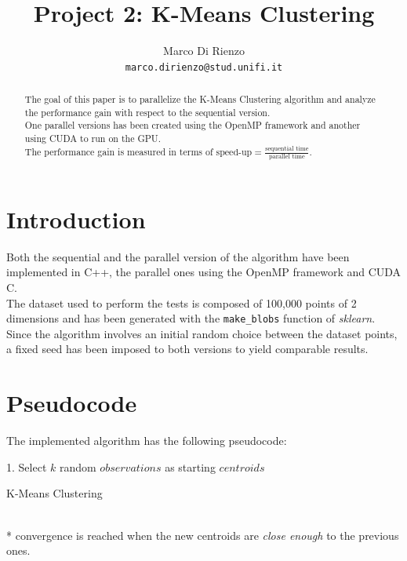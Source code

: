 \documentclass[10pt,twocolumn,letterpaper]{article}
\begin{document}
\title{Project 2: K-Means Clustering}

\author{Marco Di Rienzo\\
{\tt\small marco.dirienzo@stud.unifi.it}
}

\maketitle
\thispagestyle{empty}

\begin{abstract}
	The goal of this paper is to parallelize the K-Means Clustering algorithm and analyze the performance gain with respect to the sequential version.\\
	One parallel versions has been created using the OpenMP framework and another using CUDA to run on the GPU.\\
	The performance gain is measured in terms of $\text{speed-up}=\frac{\text{sequential time}}{\text{parallel time}}$.
\end{abstract}

\section{Introduction}
Both the sequential and the parallel version of the algorithm have been implemented in C++, the parallel ones using the OpenMP framework and CUDA C.\\
The dataset used to perform the tests is composed of 100,000 points of 2 dimensions and has been generated with the \texttt{make\_blobs} function of \textit{sklearn}.\\
Since the algorithm involves an initial random choice between the dataset points, a fixed seed has been imposed to both versions to yield comparable results.

\section{Pseudocode}
The implemented algorithm has the following pseudocode:
\begin{algorithm}
	\SetAlgoLined
	1. Select $k$ random $observations$ as starting $centroids$\;
	\caption{K-Means Clustering}
	\label{pseudocode}
\end{algorithm}\\
* convergence is reached when the new centroids are \textit{close enough} to the previous ones.
\end{document}
